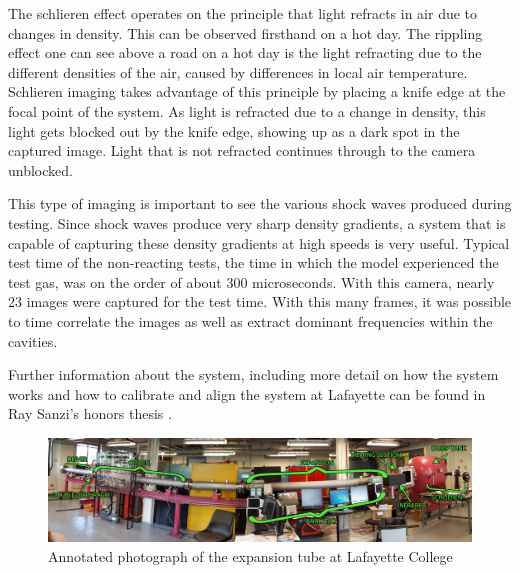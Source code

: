 The schlieren effect operates on the principle that light refracts in air due to changes in density. This can be observed firsthand on a hot day. The rippling effect one can see above a road on a hot day is the light refracting due to the different densities of the air, caused by differences in local air temperature. Schlieren imaging takes advantage of this principle by placing a knife edge at the focal point of the system. As light is refracted due to a change in density, this light gets blocked out by the knife edge, showing up as a dark spot in the captured image. Light that is not refracted continues through to the camera unblocked. 

This type of imaging is important to see the various shock waves produced during testing. Since shock waves produce very sharp density gradients, a system that is capable of capturing these density gradients at high speeds is very useful. Typical test time of the non-reacting tests, the time in which the model experienced the test gas,  was on the order of about 300 microseconds. With this camera, nearly 23 images were captured for the test time.  With this many frames, it was possible to time correlate the images as well as extract dominant frequencies within the cavities.

Further information about the system, including more detail on how the system works and how to calibrate and align the system at Lafayette can be found in Ray Sanzi's honors thesis \cite{Sanzi2016}.



\newpage

\begin{figure}
\centering
\includegraphics[width=\textwidth]{Figures/TubeLabeled.jpg}
\caption[Annotated Expansion Tube]{Annotated photograph of the expansion tube at Lafayette College}
\label{fig:tubelabeled}
\end{figure}

